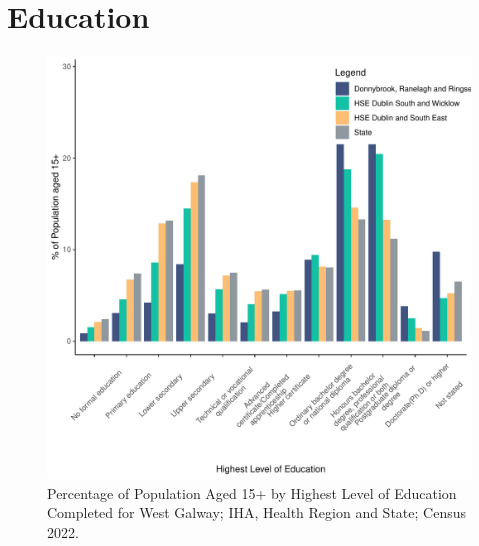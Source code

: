 \documentclass{article}
\begin{document}
\section{Education}\label{sect:Edu}
\begin{figure}[H]
	\centering
	\includegraphics[width = 120mm]{../figures/EduED.pdf}
	\caption{Percentage of Population Aged 15+ by Highest Level of Education Completed for West Galway; IHA, Health Region and State; Census 2022.}
	\label{fig:vbnv}
	\end{figure}
\end{document}
